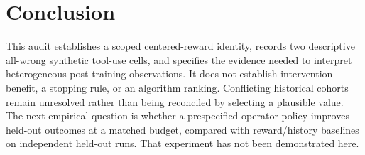 \section{Conclusion}
\label{sec:conclusion}
This audit establishes a scoped centered-reward identity, records two descriptive
all-wrong synthetic tool-use cells, and specifies the evidence needed to interpret
heterogeneous post-training observations. It does not establish intervention
benefit, a stopping rule, or an algorithm ranking. Conflicting historical cohorts
remain unresolved rather than being reconciled by selecting a plausible value.
The next empirical question is whether a prespecified operator policy improves
held-out outcomes at a matched budget, compared with reward/history baselines
on independent held-out runs. That experiment has not been demonstrated here.
